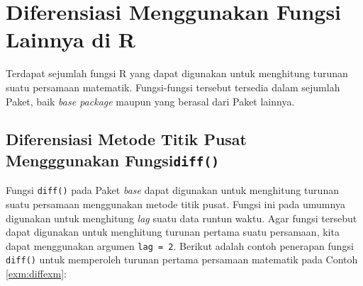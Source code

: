 \documentclass[]{book}
\newenvironment{Shaded}{\begin{snugshade}}{\end{snugshade}}
\newcommand{\CommentTok}[1]{\textcolor[rgb]{0.56,0.35,0.01}{\textit{#1}}}
\newcommand{\ControlFlowTok}[1]{\textcolor[rgb]{0.13,0.29,0.53}{\textbf{#1}}}
\newcommand{\DataTypeTok}[1]{\textcolor[rgb]{0.13,0.29,0.53}{#1}}
\newcommand{\DecValTok}[1]{\textcolor[rgb]{0.00,0.00,0.81}{#1}}
\newcommand{\KeywordTok}[1]{\textcolor[rgb]{0.13,0.29,0.53}{\textbf{#1}}}
\newcommand{\NormalTok}[1]{#1}
\newcommand{\OperatorTok}[1]{\textcolor[rgb]{0.81,0.36,0.00}{\textbf{#1}}}
\newcommand{\StringTok}[1]{\textcolor[rgb]{0.31,0.60,0.02}{#1}}
\theoremstyle{definition}
\theoremstyle{definition}
\theoremstyle{definition}
\theoremstyle{remark}
\begin{document}
\hypertarget{diffother}{%
\section{Diferensiasi Menggunakan Fungsi Lainnya di R}\label{diffother}}

Terdapat sejumlah fungsi R yang dapat digunakan untuk menghitung turunan suatu persamaan matematik. Fungsi-fungsi tersebut tersedia dalam sejumlah Paket, baik \emph{base package} maupun yang berasal dari Paket lainnya.

\hypertarget{diferensiasi-metode-titik-pusat-mengggunakan-fungsidiff}{%
\subsection{\texorpdfstring{Diferensiasi Metode Titik Pusat Mengggunakan Fungsi\texttt{diff()}}{Diferensiasi Metode Titik Pusat Mengggunakan Fungsidiff()}}\label{diferensiasi-metode-titik-pusat-mengggunakan-fungsidiff}}

Fungsi \texttt{diff()} pada Paket \emph{base} dapat digunakan untuk menghitung turunan suatu persamaan menggunakan metode titik pusat. Fungsi ini pada umumnya digunakan untuk menghitung \emph{lag} suatu data runtun waktu. Agar fungsi tersebut dapat digunakan untuk menghitung turunan pertama suatu persamaan, kita dapat menggunakan argumen \texttt{lag\ =\ 2}. Berikut adalah contoh penerapan fungsi \texttt{diff()} untuk memperoleh turunan pertama persamaan matematik pada Contoh \ref{exm:diffexm}:

\begin{Shaded}
\end{Shaded}
\end{document}
